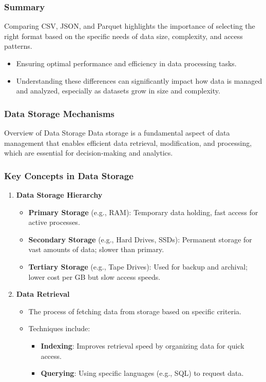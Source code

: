 \documentclass[aspectratio=169]{beamer}
\begin{document}
\begin{frame}
    \frametitle{Summary}
    Comparing CSV, JSON, and Parquet highlights the importance of selecting the right format based on the specific needs of data size, complexity, and access patterns. 
    \begin{itemize}
        \item Ensuring optimal performance and efficiency in data processing tasks.
        \item Understanding these differences can significantly impact how data is managed and analyzed, especially as datasets grow in size and complexity.
    \end{itemize}
\end{frame}

\begin{frame}[fragile]
    \frametitle{Data Storage Mechanisms}
    \begin{block}{Overview of Data Storage}
        Data storage is a fundamental aspect of data management that enables efficient data retrieval, modification, and processing, which are essential for decision-making and analytics.
    \end{block}
\end{frame}

\begin{frame}[fragile]
    \frametitle{Key Concepts in Data Storage}
    \begin{enumerate}
        \item \textbf{Data Storage Hierarchy}
        \begin{itemize}
            \item \textbf{Primary Storage} (e.g., RAM): Temporary data holding, fast access for active processes.
            \item \textbf{Secondary Storage} (e.g., Hard Drives, SSDs): Permanent storage for vast amounts of data; slower than primary.
            \item \textbf{Tertiary Storage} (e.g., Tape Drives): Used for backup and archival; lower cost per GB but slow access speeds.
        \end{itemize}
        
        \item \textbf{Data Retrieval}
        \begin{itemize}
            \item The process of fetching data from storage based on specific criteria.
            \item Techniques include:
            \begin{itemize}
                \item \textbf{Indexing}: Improves retrieval speed by organizing data for quick access.
                \item \textbf{Querying}: Using specific languages (e.g., SQL) to request data.
            \end{itemize}
        \end{itemize}
    \end{enumerate}
\end{frame}
\end{document}
